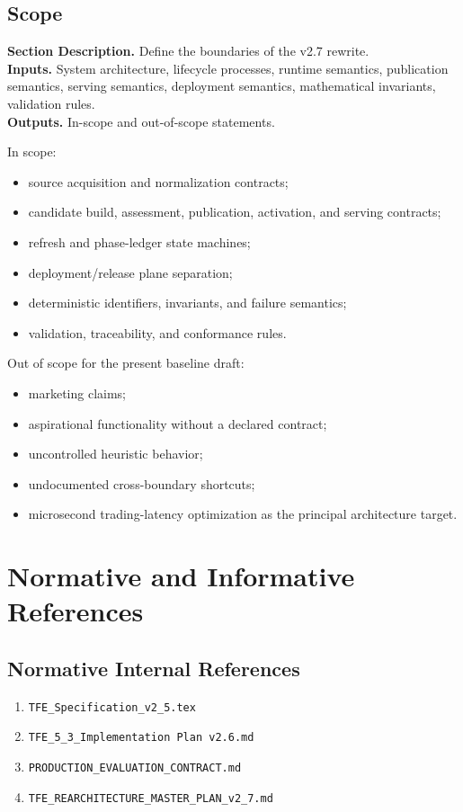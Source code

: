 \documentclass[11pt]{report}
\newcommand{\meta}[3]{\textbf{Section Description.} #1\\
\textbf{Inputs.} #2\\
\textbf{Outputs.} #3\par}
\begin{document}
\section{Scope}
\meta{Define the boundaries of the v2.7 rewrite.}{System architecture, lifecycle processes, runtime semantics, publication semantics, serving semantics, deployment semantics, mathematical invariants, validation rules.}{In-scope and out-of-scope statements.}

In scope:
\begin{itemize}
    \item source acquisition and normalization contracts;
    \item candidate build, assessment, publication, activation, and serving contracts;
    \item refresh and phase-ledger state machines;
    \item deployment/release plane separation;
    \item deterministic identifiers, invariants, and failure semantics;
    \item validation, traceability, and conformance rules.
\end{itemize}

Out of scope for the present baseline draft:
\begin{itemize}
    \item marketing claims;
    \item aspirational functionality without a declared contract;
    \item uncontrolled heuristic behavior;
    \item undocumented cross-boundary shortcuts;
    \item microsecond trading-latency optimization as the principal architecture target.
\end{itemize}

\chapter{Normative and Informative References}
\section{Normative Internal References}
\begin{enumerate}[leftmargin=1.2cm]
    \item \texttt{TFE\_Specification\_v2\_5.tex}
    \item \texttt{TFE\_5\_3\_Implementation Plan v2.6.md}
    \item \texttt{PRODUCTION\_EVALUATION\_CONTRACT.md}
    \item \texttt{TFE\_REARCHITECTURE\_MASTER\_PLAN\_v2\_7.md}
\end{enumerate}
\end{document}
